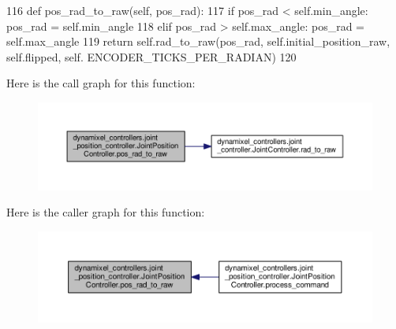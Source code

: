 \begin{DoxyCode}
116     \textcolor{keyword}{def }pos\_rad\_to\_raw(self, pos\_rad):
117         \textcolor{keywordflow}{if} pos\_rad < self.min\_angle: pos\_rad = self.min\_angle
118         \textcolor{keywordflow}{elif} pos\_rad > self.max\_angle: pos\_rad = self.max\_angle
119         \textcolor{keywordflow}{return} self.rad\_to\_raw(pos\_rad, self.initial\_position\_raw, self.flipped, self.
      ENCODER\_TICKS\_PER\_RADIAN)
120 
\end{DoxyCode}
Here is the call graph for this function\+:
\nopagebreak
\begin{figure}[H]
\begin{center}
\leavevmode
\includegraphics[width=350pt]{d1/df0/classdynamixel__controllers_1_1joint__position__controller_1_1_joint_position_controller_ac67e65576e301dab233d3c70444e48f3_cgraph}
\end{center}
\end{figure}
Here is the caller graph for this function\+:
\nopagebreak
\begin{figure}[H]
\begin{center}
\leavevmode
\includegraphics[width=350pt]{d1/df0/classdynamixel__controllers_1_1joint__position__controller_1_1_joint_position_controller_ac67e65576e301dab233d3c70444e48f3_icgraph}
\end{center}
\end{figure}
\mbox{\label{classdynamixel__controllers_1_1joint__position__controller_1_1_joint_position_controller_af81781a3d97047b957206165ad3d2fd3}} 
